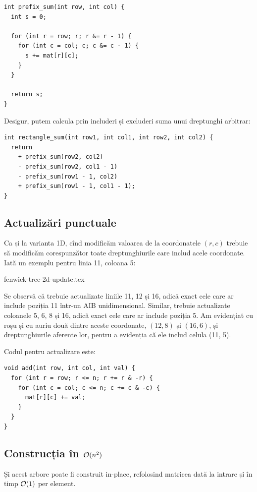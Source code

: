 \documentclass[../main.tex]{subfiles}
\begin{document}
\begin{verbatim}
int prefix_sum(int row, int col) {
  int s = 0;

  for (int r = row; r; r &= r - 1) {
    for (int c = col; c; c &= c - 1) {
      s += mat[r][c];
    }
  }

  return s;
}
\end{verbatim}

Desigur, putem calcula prin includeri și excluderi suma unui dreptunghi arbitrar:

\begin{verbatim}
int rectangle_sum(int row1, int col1, int row2, int col2) {
  return
    + prefix_sum(row2, col2)
    - prefix_sum(row2, col1 - 1)
    - prefix_sum(row1 - 1, col2)
    + prefix_sum(row1 - 1, col1 - 1);
}
\end{verbatim}

\subsection{Actualizări punctuale}

Ca și la varianta 1D, cînd modificăm valoarea de la coordonatele $(r, c)$ trebuie să modificăm corespunzător toate dreptunghiurile care includ acele coordonate. Iată un exemplu pentru linia 11, coloana 5:

{fenwick-tree-2d-update.tex}

Se observă că trebuie actualizate liniile 11, 12 și 16, adică exact cele care ar include poziția 11 într-un AIB unidimensional. Similar, trebuie actualizate coloanele 5, 6, 8 și 16, adică exact cele care ar include poziția 5. Am evidențiat cu roșu și cu auriu două dintre aceste coordonate, $(12, 8)$ și $(16, 6)$, și dreptunghiurile aferente lor, pentru a evidenția că ele includ celula (11, 5).

Codul pentru actualizare este:

\begin{verbatim}
void add(int row, int col, int val) {
  for (int r = row; r <= n; r += r & -r) {
    for (int c = col; c <= n; c += c & -c) {
      mat[r][c] += val;
    }
  }
}
\end{verbatim}

\subsection{Construcția în \texorpdfstring{$\mathcal{O}(n^2)$}{O(n²)}}

Și acest arbore poate fi construit in-place, refolosind matricea dată la intrare și în timp $\mathcal{O}(1)$ per element.
\end{document}
